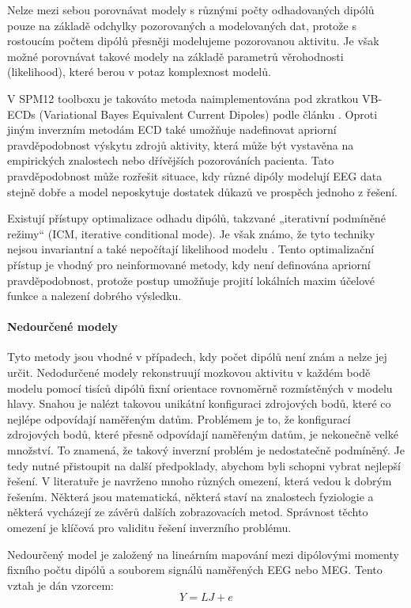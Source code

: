 Nelze mezi sebou porovnávat modely s různými počty odhadovaných dipólů pouze na základě odchylky pozorovaných a modelovaných dat, protože s rostoucím počtem dipólů přesněji modelujeme pozorovanou aktivitu. Je však možné porovnávat takové modely na základě parametrů věrohodnosti (likelihood), které berou v potaz komplexnost modelů. \cite{42}

V SPM12 toolboxu je takováto metoda naimplementována pod zkratkou VB-ECDs (Variational Bayes Equivalent Current Dipoles) podle článku \cite{42}. Oproti jiným inverzním metodám ECD také umožňuje nadefinovat apriorní pravděpodobnost výskytu zdrojů aktivity, která může být vystavěna na empirických znalostech nebo dřívějších pozorováních pacienta. Tato pravděpodobnost může rozřešit situace, kdy různé dipóly modelují EEG data stejně dobře a model neposkytuje dostatek důkazů ve prospěch jednoho z řešení. \cite{28,42}

Existují přístupy optimalizace odhadu dipólů, takzvané „iterativní podmíněné režimy“ (ICM, iterative conditional mode). Je však známo, že tyto techniky nejsou invariantní a také nepočítají likelihood modelu \cite{42}. Tento optimalizační přístup je vhodný pro neinformované metody, kdy není definována apriorní pravděpodobnost, protože postup umožňuje projití lokálních maxim účelové funkce a nalezení dobrého výsledku. \cite{28}

\paragraph{Nedourčené modely}
Tyto metody jsou vhodné v případech, kdy počet dipólů není znám a nelze jej určit. Nedodurčené modely rekonstruují mozkovou aktivitu v každém bodě modelu pomocí tisíců dipólů fixní orientace rovnoměrně rozmístěných v modelu hlavy. Snahou je nalézt takovou unikátní konfiguraci zdrojových bodů, které co nejlépe odpovídají naměřeným datům. Problémem je to, že konfigurací zdrojových bodů, které přesně odpovídají naměřeným datům, je nekonečně velké množství. To znamená, že takový inverzní problém je nedostatečně podmíněný. Je tedy nutné přistoupit na další předpoklady, abychom byli schopni vybrat nejlepší řešení. V literatuře je navrženo mnoho různých omezení, která vedou k dobrým řešením. Některá jsou matematická, některá staví na znalostech fyziologie a některá vycházejí ze závěrů dalších zobrazovacích metod. Správnost těchto omezení je klíčová pro validitu řešení inverzního problému. \cite{29}

Nedourčený model je založený na lineárním mapování mezi dipólovými momenty fixního počtu dipólů a souborem signálů naměřených EEG nebo MEG. Tento vztah je dán vzorcem: 
\begin{equation}
Y = LJ + e
\end{equation}

